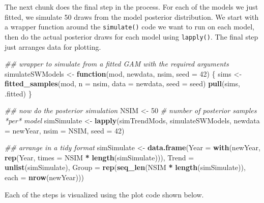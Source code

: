 \documentclass[12pt,]{article}
\newenvironment{Shaded}{\begin{snugshade}}{\end{snugshade}}
\newcommand{\CommentTok}[1]{\textcolor[rgb]{0.56,0.35,0.01}{\textit{#1}}}
\newcommand{\ControlFlowTok}[1]{\textcolor[rgb]{0.13,0.29,0.53}{\textbf{#1}}}
\newcommand{\DataTypeTok}[1]{\textcolor[rgb]{0.13,0.29,0.53}{#1}}
\newcommand{\DecValTok}[1]{\textcolor[rgb]{0.00,0.00,0.81}{#1}}
\newcommand{\KeywordTok}[1]{\textcolor[rgb]{0.13,0.29,0.53}{\textbf{#1}}}
\newcommand{\NormalTok}[1]{#1}
\newcommand{\OperatorTok}[1]{\textcolor[rgb]{0.81,0.36,0.00}{\textbf{#1}}}
\newcommand{\StringTok}[1]{\textcolor[rgb]{0.31,0.60,0.02}{#1}}
\begin{document}
The next chunk does the final step in the process. For each of the
models we just fitted, we simulate 50 draws from the model posterior
distribution. We start with a wrapper function around the
\texttt{simulate()} code we want to run on each model, then do the
actual posterior draws for each model using \texttt{lapply()}. The final
step just arranges data for plotting.

\begin{Shaded}
\begin{Highlighting}[]
\CommentTok{## wrapper to simulate from a fitted GAM with the required arguments}
\NormalTok{simulateSWModels <-}\StringTok{ }\ControlFlowTok{function}\NormalTok{(mod, newdata, nsim, }\DataTypeTok{seed =} \DecValTok{42}\NormalTok{) \{}
\NormalTok{    sims <-}\StringTok{ }\KeywordTok{fitted_samples}\NormalTok{(mod, }\DataTypeTok{n =}\NormalTok{ nsim, }\DataTypeTok{data =}\NormalTok{ newdata, }\DataTypeTok{seed =}\NormalTok{ seed)}
    \KeywordTok{pull}\NormalTok{(sims, .fitted)}
\NormalTok{\}}

\CommentTok{## now do the posterior simulation}
\NormalTok{NSIM <-}\StringTok{ }\DecValTok{50}     \CommentTok{# number of posterior samples *per* model}
\NormalTok{simSimulate <-}\StringTok{ }\KeywordTok{lapply}\NormalTok{(simTrendMods, simulateSWModels, }\DataTypeTok{newdata =}\NormalTok{ newYear,}
                      \DataTypeTok{nsim =}\NormalTok{ NSIM, }\DataTypeTok{seed =} \DecValTok{42}\NormalTok{)}

\CommentTok{## arrange in a tidy format}
\NormalTok{simSimulate <-}
\StringTok{  }\KeywordTok{data.frame}\NormalTok{(}\DataTypeTok{Year  =} \KeywordTok{with}\NormalTok{(newYear,}
                          \KeywordTok{rep}\NormalTok{(Year, }\DataTypeTok{times =}\NormalTok{ NSIM }\OperatorTok{*}\StringTok{ }\KeywordTok{length}\NormalTok{(simSimulate))),}
             \DataTypeTok{Trend =} \KeywordTok{unlist}\NormalTok{(simSimulate),}
             \DataTypeTok{Group =} \KeywordTok{rep}\NormalTok{(}\KeywordTok{seq_len}\NormalTok{(NSIM }\OperatorTok{*}\StringTok{ }\KeywordTok{length}\NormalTok{(simSimulate)),}
                         \DataTypeTok{each =} \KeywordTok{nrow}\NormalTok{(newYear)))}
\end{Highlighting}
\end{Shaded}

Each of the steps is visualized using the plot code shown below.
\end{document}
